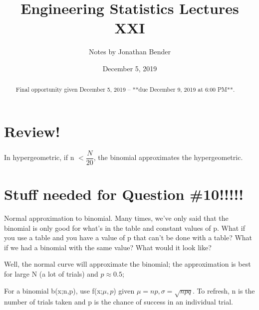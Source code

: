 \documentclass[]{article}
\title{Engineering Statistics Lectures XXI}
\author{Notes by Jonathan Bender}
\date{December 5, 2019}
\begin{document}
	
	\maketitle
	
	\begin{abstract}
		Final opportunity given December 5, 2019 -- **due December 9, 2019 at 6:00 PM**.
	\end{abstract}

	\section{Review!}
		In hypergeometric, if n $< \dfrac{N}{20}$, the binomial approximates the hypergeometric.
		
	\section{Stuff needed for Question \#10!!!!!}
		Normal approximation to binomial. Many times, we've only said that the binomial is only good for what's in the table and constant values of p. What if you use a table and you have a value of p that can't be done with a table? What if we had a binomial with the same value? What would it look like?
		
		Well, the normal curve will approximate the binomial; the approximation is best for large N (a lot of trials) and $p \approx 0.5$;
		
		For a binomial b(x;n,p), use f(x;$\mu,p$) given $\mu = np, \sigma = \sqrt{npq}$. To refresh, n is the number of trials taken and p is the chance of success in an individual trial.
\end{document}
